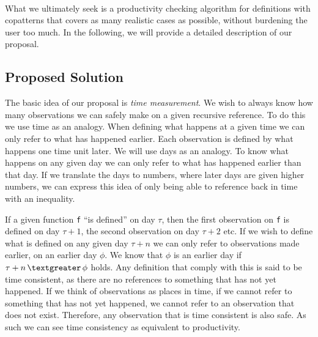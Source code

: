 \paragraph{}
What we ultimately seek is a productivity checking algorithm for definitions with copatterns that covers as many realistic cases as possible, without burdening the user too much. In the following, we will provide a detailed description of our proposal.
\subsection{Proposed Solution}
The basic idea of our proposal is \textit{time measurement}. We wish to always know how many observations we can safely make on a given recursive reference. To do this we use time as an analogy. When defining what happens at a given time we can only refer to what has happened earlier. Each observation is defined by what happens one time unit later. We will use days as an analogy. To know what happens on any given day we can only refer to what has happened earlier than that day. If we translate the days to numbers, where later days are given higher numbers, we can express this idea of only being able to reference back in time with an inequality.

If a given function \texttt{f} ``is defined'' on day $\tau$, then the first observation on \texttt{f} is defined on day $\tau+1$, the second observation on day $\tau+2$ etc. If we wish to define what is defined on any given day $\tau+n$ we can only refer to observations made earlier, on an earlier day $\phi$. We know that $\phi$ is an earlier day if $\tau+n\, \textgreater \,\phi$ holds. Any definition that comply with this is said to be time consistent, as there are no references to something that has not yet happened. If we think of observations as places in time, if we cannot refer to something that has not yet happened, we cannot refer to an observation that does not exist. Therefore, any observation that is time consistent is also safe. As such we can see time consistency as equivalent to productivity.

